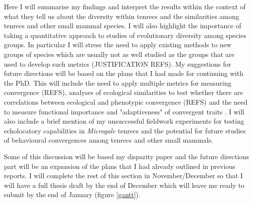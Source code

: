 \documentclass[12pt,a4paper]{article}
\begin{document}
	Here I will summarise my findings and interpret the results within the context of what they tell us about the diversity within tenrecs and the similarities among tenrecs and other small mammal species. I will also highlight the importance of taking a quantitative approach to studies of evolutionary diversity among species groups. In particular I will stress the need to apply existing methods to new groups of species which are usually not as well studied as the groups that are used to develop such metrics (JUSTIFICATION REFS). 
	My suggestions for future directions will be based on the plans that I had made for continuing with the PhD. This will include the need to apply multiple metrics for measuring convergence (REFS), analyses of ecological similarities to test whether there are correlations between ecological and phenotypic convergence (REFS) and the need to measure
	functional importance and "adaptiveness" of convergent traits \citep{Losos2010}. I will also include a brief mention of my unsuccessful fieldwork experiments for testing echolocatory capabilities in \textit{Microgale} tenrecs and the potential for future studies of behavioural convergences among tenrecs and other small mammals.
	
	Some of this discussion will be based my disparity paper and the future directions part will be an expansion of the plans that I had already outlined in previous reports. I will complete the rest of this section in November/December so that I will have a full thesis draft by the end of December which will leave me ready to submit by the end of January (figure \ref{gantt}).


\end{document}
